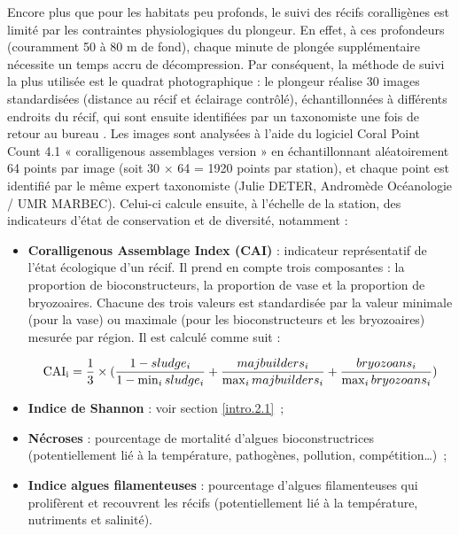 Encore plus que pour les habitats peu profonds, le suivi des récifs coralligènes est limité par les contraintes physiologiques du plongeur. En effet, à ces profondeurs (couramment 50 à 80 m de fond), chaque minute de plongée supplémentaire nécessite un temps accru de décompression. Par conséquent, la méthode de suivi la plus utilisée est le quadrat photographique : le plongeur réalise 30 images standardisées (distance au récif et éclairage contrôlé), échantillonnées à différents endroits du récif, qui sont ensuite identifiées par un taxonomiste une fois de retour au bureau \citep{deter_rapid_2012}. Les images sont analysées à l’aide du logiciel Coral Point Count \citep{cpce_coral_2011} 4.1 « coralligenous assemblages version » en échantillonnant aléatoirement 64 points par image (soit 30 $\times$ 64 = 1920 points par station), et chaque point est identifié par le même expert taxonomiste (Julie DETER, Andromède Océanologie / UMR MARBEC). Celui-ci calcule ensuite, à l’échelle de la station, des indicateurs d’état de conservation et de diversité, notamment :

\begin{itemize}
    \item \textbf{Coralligenous Assemblage Index (CAI)} \citep{deter_preliminary_2012} : indicateur représentatif de l’état écologique d’un récif. Il prend en compte trois composantes : la proportion de bioconstructeurs, la proportion de vase et la proportion de bryozoaires. Chacune des trois valeurs est standardisée par la valeur minimale (pour la vase) ou maximale (pour les bioconstructeurs et les bryozoaires) mesurée par région. Il est calculé comme suit :
    
    \begin{equation}
        \text{CAI\textsubscript{i}}=\frac{1}{3}\times(\frac{1-sludge_i}{1-\min_{i}sludge_i}+\frac{majbuilders_i}{\max_{i}majbuilders_i}+\frac{bryozoans_i}{\max_{i}bryozoans_i})
        \label{eqintro.2}
    \end{equation}
    
    \item \textbf{Indice de Shannon} \citep{magurran_measuring_2004} : voir section \ref{intro.2.1}~;
    
    \item \textbf{Nécroses} : pourcentage de mortalité d’algues bioconstructrices (potentiellement lié à la température, pathogènes, pollution, compétition…)~;
    
    \item \textbf{Indice algues filamenteuses} : pourcentage d’algues filamenteuses qui prolifèrent et recouvrent les récifs (potentiellement lié à la température, nutriments et salinité).

\end{itemize}

